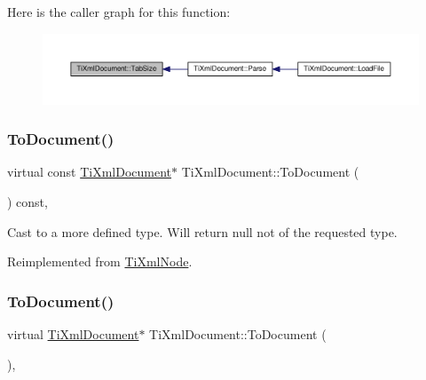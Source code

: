 Here is the caller graph for this function\+:\nopagebreak
\begin{figure}[H]
\begin{center}
\leavevmode
\includegraphics[width=350pt]{class_ti_xml_document_a81e6ffeee8f5d025a171eabf79abdad7_icgraph}
\end{center}
\end{figure}
\mbox{\label{class_ti_xml_document_a468e582640e3c4f740f7168d8b4a6e4a}} 
\subsubsection{\texorpdfstring{To\+Document()}{ToDocument()}\hspace{0.1cm}{\footnotesize\ttfamily [1/2]}}
{\footnotesize\ttfamily virtual const \hyperlink{class_ti_xml_document}{Ti\+Xml\+Document}$\ast$ Ti\+Xml\+Document\+::\+To\+Document (\begin{DoxyParamCaption}{ }\end{DoxyParamCaption}) const\hspace{0.3cm}{\ttfamily [inline]}, {\ttfamily [virtual]}}



Cast to a more defined type. Will return null not of the requested type. 



Reimplemented from \hyperlink{class_ti_xml_node_a775a904618cad6e4a8049bda4f5a6aa9}{Ti\+Xml\+Node}.

\mbox{\label{class_ti_xml_document_a1025d942a1f328fd742d545e37efdd42}} 
\subsubsection{\texorpdfstring{To\+Document()}{ToDocument()}\hspace{0.1cm}{\footnotesize\ttfamily [2/2]}}
{\footnotesize\ttfamily virtual \hyperlink{class_ti_xml_document}{Ti\+Xml\+Document}$\ast$ Ti\+Xml\+Document\+::\+To\+Document (\begin{DoxyParamCaption}{ }\end{DoxyParamCaption})\hspace{0.3cm}{\ttfamily [inline]}, {\ttfamily [virtual]}}



